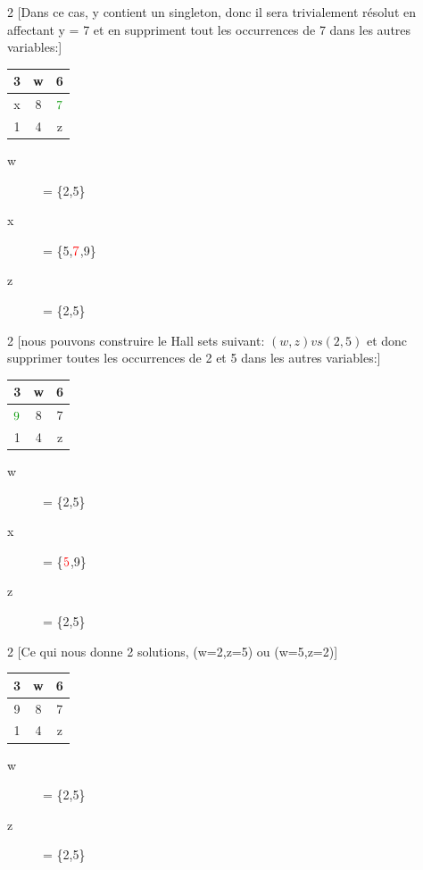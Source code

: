 \begin{multicols}{2}
[Dans ce cas, y contient un singleton, donc il sera trivialement résolut en affectant y = 7 et en suppriment tout les occurrences de 7 dans les autres variables:]
\begin{tabular}{|c|c|c|}
\hline 3 & w & 6\\
\hline x & 8 & $\cvert{7}$\\
\hline 1 & 4 & z\\
\hline
\end{tabular}
\begin{description}
\item[w] = \{2,5\}
\item[x] = \{5,$\textcolor{red}{7}$,9\}
\item[z] = \{2,5\}
\end{description}
\end{multicols}

\begin{multicols}{2}
[nous pouvons construire le Hall sets suivant: $(w,z) vs (2,5)$ et donc supprimer toutes les occurrences de 2 et 5 dans les autres variables:]
\begin{tabular}{|c|c|c|}
\hline 3 & w & 6\\
\hline $\cvert{9}$ & 8 & 7\\
\hline 1 & 4 & z\\
\hline
\end{tabular}
\begin{description}
\item[w] = \{2,5\}
\item[x] = \{$\textcolor{red}{5}$,9\}
\item[z] = \{2,5\}
\end{description}
\end{multicols}

\begin{multicols}{2}
[Ce qui nous donne 2 solutions, (w=2,z=5) ou (w=5,z=2)]
\begin{tabular}{|c|c|c|}
\hline 3 & w & 6\\
\hline 9 & 8 & 7\\
\hline 1 & 4 & z\\
\hline
\end{tabular}
\begin{description}
\item[w] = \{2,5\}
\item[z] = \{2,5\}
\end{description}
\end{multicols}
\pagebreak

